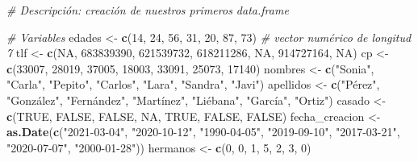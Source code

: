 \documentclass[11pt,]{book}
\newenvironment{Shaded}{\begin{snugshade}}{\end{snugshade}}
\newcommand{\CommentTok}[1]{\textcolor[rgb]{0.37,0.37,0.37}{\textit{#1}}}
\newcommand{\DecValTok}[1]{\textcolor[rgb]{0.06,0.06,0.06}{#1}}
\newcommand{\KeywordTok}[1]{\textcolor[rgb]{0.27,0.27,0.27}{\textbf{#1}}}
\newcommand{\NormalTok}[1]{#1}
\newcommand{\OtherTok}[1]{\textcolor[rgb]{0.37,0.37,0.37}{#1}}
\newcommand{\StringTok}[1]{\textcolor[rgb]{0.5,0.5,0.5}{#1}}
\begin{document}
\begin{Shaded}
\begin{Highlighting}[]
\CommentTok{# Descripción: creación de nuestros primeros data.frame}

\CommentTok{# Variables}
\NormalTok{edades <-}\StringTok{ }\KeywordTok{c}\NormalTok{(}\DecValTok{14}\NormalTok{, }\DecValTok{24}\NormalTok{, }\DecValTok{56}\NormalTok{, }\DecValTok{31}\NormalTok{, }\DecValTok{20}\NormalTok{, }\DecValTok{87}\NormalTok{, }\DecValTok{73}\NormalTok{) }\CommentTok{# vector numérico de longitud 7}
\NormalTok{tlf <-}\StringTok{ }\KeywordTok{c}\NormalTok{(}\OtherTok{NA}\NormalTok{, }\DecValTok{683839390}\NormalTok{, }\DecValTok{621539732}\NormalTok{, }\DecValTok{618211286}\NormalTok{, }\OtherTok{NA}\NormalTok{, }\DecValTok{914727164}\NormalTok{, }\OtherTok{NA}\NormalTok{)}
\NormalTok{cp <-}\StringTok{ }\KeywordTok{c}\NormalTok{(}\DecValTok{33007}\NormalTok{, }\DecValTok{28019}\NormalTok{, }\DecValTok{37005}\NormalTok{, }\DecValTok{18003}\NormalTok{, }\DecValTok{33091}\NormalTok{, }\DecValTok{25073}\NormalTok{, }\DecValTok{17140}\NormalTok{)}
\NormalTok{nombres <-}\StringTok{ }\KeywordTok{c}\NormalTok{(}\StringTok{"Sonia"}\NormalTok{, }\StringTok{"Carla"}\NormalTok{, }\StringTok{"Pepito"}\NormalTok{, }\StringTok{"Carlos"}\NormalTok{, }\StringTok{"Lara"}\NormalTok{, }\StringTok{"Sandra"}\NormalTok{, }\StringTok{"Javi"}\NormalTok{)}
\NormalTok{apellidos <-}\StringTok{ }\KeywordTok{c}\NormalTok{(}\StringTok{"Pérez"}\NormalTok{, }\StringTok{"González"}\NormalTok{, }\StringTok{"Fernández"}\NormalTok{, }\StringTok{"Martínez"}\NormalTok{, }\StringTok{"Liébana"}\NormalTok{, }\StringTok{"García"}\NormalTok{, }\StringTok{"Ortiz"}\NormalTok{)}
\NormalTok{casado <-}\StringTok{ }\KeywordTok{c}\NormalTok{(}\OtherTok{TRUE}\NormalTok{, }\OtherTok{FALSE}\NormalTok{, }\OtherTok{FALSE}\NormalTok{, }\OtherTok{NA}\NormalTok{, }\OtherTok{TRUE}\NormalTok{, }\OtherTok{FALSE}\NormalTok{, }\OtherTok{FALSE}\NormalTok{)}
\NormalTok{fecha_creacion <-}
\StringTok{  }\KeywordTok{as.Date}\NormalTok{(}\KeywordTok{c}\NormalTok{(}\StringTok{"2021-03-04"}\NormalTok{, }\StringTok{"2020-10-12"}\NormalTok{, }\StringTok{"1990-04-05"}\NormalTok{, }\StringTok{"2019-09-10"}\NormalTok{,}
            \StringTok{"2017-03-21"}\NormalTok{, }\StringTok{"2020-07-07"}\NormalTok{, }\StringTok{"2000-01-28"}\NormalTok{))}
\NormalTok{hermanos <-}\StringTok{ }\KeywordTok{c}\NormalTok{(}\DecValTok{0}\NormalTok{, }\DecValTok{0}\NormalTok{, }\DecValTok{1}\NormalTok{, }\DecValTok{5}\NormalTok{, }\DecValTok{2}\NormalTok{, }\DecValTok{3}\NormalTok{, }\DecValTok{0}\NormalTok{)}


\end{Highlighting}
\end{Shaded}
\end{document}
